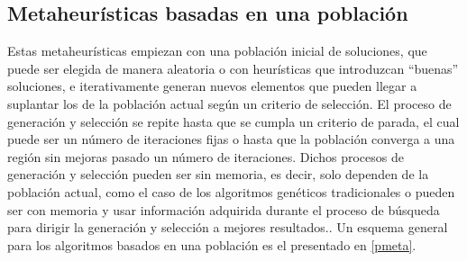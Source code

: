

\subsection{Metaheurísticas basadas en una población}

Estas metaheurísticas empiezan con una población inicial de soluciones, que puede ser elegida de manera aleatoria o con heurísticas que introduzcan ``buenas'' soluciones, e iterativamente generan nuevos elementos que pueden llegar a suplantar los de la población actual según un criterio de selección. El proceso de generación y selección se repite hasta que se cumpla un criterio de parada, el cual puede ser un número de iteraciones fijas o hasta que la población converga a una región sin mejoras pasado un número de iteraciones. Dichos procesos de generación y selección pueden ser sin memoria, es decir, solo dependen de la población actual, como el caso de los algoritmos genéticos tradicionales o pueden ser con memoria y usar información adquirida durante el proceso de búsqueda para dirigir la generación y selección a mejores resultados.\cite{talbi2009metaheuristics}. Un esquema general para los algoritmos basados en una población es el presentado en \ref{pmeta}.

